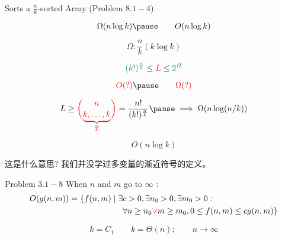 
\begin{frame}{}
  \begin{exampleblock}{Sorts a $\frac{n}{k}$-sorted Array (Problem $8.1-4$)}

    \pause
    \vspace{-0.50cm}
    \[
      \Omega(n \log k) \pause \qquad O(n \log k)
    \]
  \end{exampleblock}

  \pause
  \vspace{-0.30cm}
  \[
    \Omega: \frac{n}{k} (k \log k)
  \]

  \pause
  \[
    \textcolor{teal}{(k!)^{\frac{n}{k}}} \le \textcolor{red}{L} \le \textcolor{teal}{2^{H}}
  \]
\end{frame}

\begin{frame}{}
  \centerline{}

  \pause
  \vspace{-0.30cm}
  \[
    \red{O(?)} \pause \qquad \red{\Omega(?)}
  \]

  \pause
  \vspace{-0.30cm}
  \[
    L \ge \red{\binom{n}{\underbrace{k, \ldots, k}_{\frac{n}{k}}}} = \frac{n!}{(k!)^{\frac{n}{k}}} \pause \implies \Omega(n \log(n/k))
  \]
\end{frame}

\begin{frame}{}
  \[
    O(n \log k)
  \]

  \pause
  \begin{CJK*}{UTF8}{gbsn}
    \centerline{ 这是什么意思? 我们并没学过多变量的渐近符号的定义。} 
  \end{CJK*}

  \pause
  \vspace{0.30cm}
  \begin{exampleblock}{Problem $3.1-8$}
    When $n$ and $m$ go to $\infty$ :
    \begin{align*}
      O(g(n,m)) = \{f(n,m) \mid \exists & c > 0, \exists n_0 > 0, \exists m_0 > 0: \\
	& \forall n \ge n_0 \textcolor{red}{\lor} m \ge m_0, 0 \le f(n,m) \le cg(n,m)\}
    \end{align*}
  \end{exampleblock}

  \pause
  \vspace{0.30cm}
  \[
    k = C_1 \qquad k = \Theta(n); \qquad n \to \infty
  \]
\end{frame}

